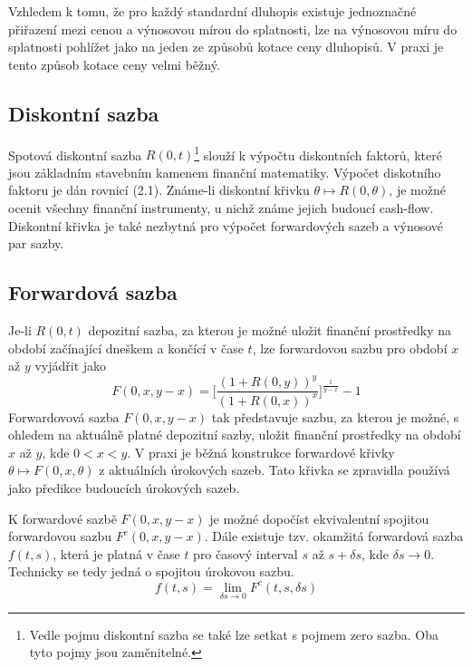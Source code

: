 \documentclass[a4paper]{book}
\begin{document}
Vzhledem k tomu, že pro každý standardní dluhopis existuje jednoznačné přiřazení mezi cenou a výnosovou mírou do splatnosti, lze na výnosovou míru do splatnosti pohlížet jako na jeden ze způsobů kotace ceny dluhopisů. V praxi je tento způsob kotace ceny velmi běžný.

\subsection{Diskontní sazba}

Spotová diskontní sazba $R(0,t)$\footnote{Vedle pojmu diskontní sazba se také lze setkat s pojmem zero sazba. Oba tyto pojmy jsou zaměnitelné.} slouží k výpočtu diskontních faktorů, které jsou základním stavebním kamenem finanční matematiky. Výpočet diskotního faktoru je dán rovnicí (2.1).
Známe-li diskontní křivku $\theta \longmapsto R(0, \theta)$, je možné ocenit všechny finanční instrumenty, u nichž známe jejich budoucí cash-flow. Diskontní křivka je také nezbytná pro výpočet forwardových sazeb a výnosové par sazby.

\subsection{Forwardová sazba}

Je-li $R(0,t)$ depozitní sazba, za kterou je možné uložit finanční prostředky na období začínající dneškem a končící v čase $t$, lze forwardovou sazbu pro období $x$ až $y$ vyjádřit jako
\begin{equation*}
F(0,x, y-x) = \Bigg[ \frac{(1 + R(0,y))^y}{(1 + R(0,x))^x}\Bigg]^{\frac{1}{y-x}} - 1
\end{equation*}
Forwardovová sazba $F(0,x, y-x)$ tak představuje sazbu, za kterou je možné, s ohledem na aktuálně platné depozitní sazby, uložit finanční prostředky na období $x$ až $y$, kde $0 < x < y$. V praxi je běžná konstrukce forwardové křivky $\theta \longmapsto F(0,x, \theta)$ z aktuálních úrokových sazeb. Tato křivka se zpravidla používá jako předikce budoucích úrokových sazeb.

K forwardové sazbě $F(0,x, y-x)$ je možné dopočíst ekvivalentní spojitou forwardovou sazbu $F^c(0,x, y-x)$. Dále existuje tzv. okamžitá forwardová sazba $f(t,s)$, která je platná v čase $t$ pro časový interval $s$ až $s + \delta s$, kde $\delta s \rightarrow 0$. Technicky se tedy jedná o spojitou úrokovou sazbu.
\begin{equation*}
f(t,s) = \underset{\delta s \rightarrow 0} \lim F^c(t,s,\delta s)
\end{equation*}
\end{document}
